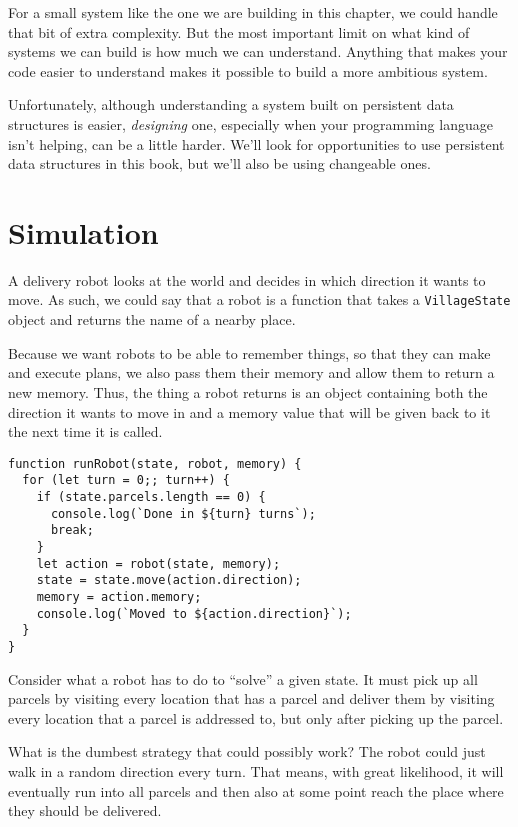 For a small system like the one we are building in this chapter, we could handle that bit of extra complexity. But the most important limit on what kind of systems we can build is how much we can understand. Anything that makes your code easier to understand makes it possible to build a more ambitious system.

Unfortunately, although understanding a system built on persistent data structures is easier, \emph{designing} one, especially when your programming language isn't helping, can be a little harder. We'll look for opportunities to use persistent data structures in this book, but we'll also be using changeable ones.

\section{Simulation}

A delivery robot looks at the world and decides in which direction it wants to move. As such, we could say that a robot is a function that takes a \lstinline`VillageState` object and returns the name of a nearby place.

Because we want robots to be able to remember things, so that they can make and execute plans, we also pass them their memory and allow them to return a new memory. Thus, the thing a robot returns is an object containing both the direction it wants to move in and a memory value that will be given back to it the next time it is called.

\begin{lstlisting}
function runRobot(state, robot, memory) {
  for (let turn = 0;; turn++) {
    if (state.parcels.length == 0) {
      console.log(`Done in ${turn} turns`);
      break;
    }
    let action = robot(state, memory);
    state = state.move(action.direction);
    memory = action.memory;
    console.log(`Moved to ${action.direction}`);
  }
}
\end{lstlisting}
\noindent

Consider what a robot has to do to ``solve'' a given state. It must pick up all parcels by visiting every location that has a parcel and deliver them by visiting every location that a parcel is addressed to, but only after picking up the parcel.

What is the dumbest strategy that could possibly work? The robot could just walk in a random direction every turn. That means, with great likelihood, it will eventually run into all parcels and then also at some point reach the place where they should be delivered.


